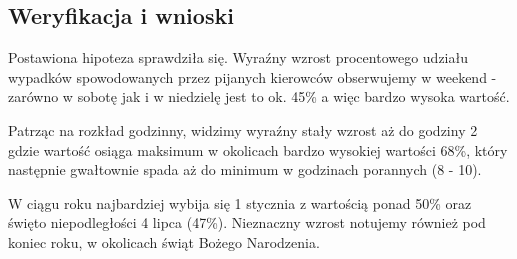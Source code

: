 \subsection{Weryfikacja i wnioski}\label{weryfikacja-i-wnioski}

Postawiona hipoteza sprawdziła się. Wyraźny wzrost procentowego udziału
wypadków spowodowanych przez pijanych kierowców obserwujemy w weekend -
zarówno w sobotę jak i w niedzielę jest to ok. 45\% a więc bardzo wysoka
wartość.

Patrząc na rozkład godzinny, widzimy wyraźny stały wzrost aż do godziny
2 gdzie wartość osiąga maksimum w okolicach bardzo wysokiej wartości
68\%, który następnie gwałtownie spada aż do minimum w godzinach
porannych (8 - 10).

W ciągu roku najbardziej wybija się 1 stycznia z wartością ponad 50\%
oraz święto niepodległości 4 lipca (47\%). Nieznaczny wzrost notujemy
również pod koniec roku, w okolicach świąt Bożego Narodzenia.
